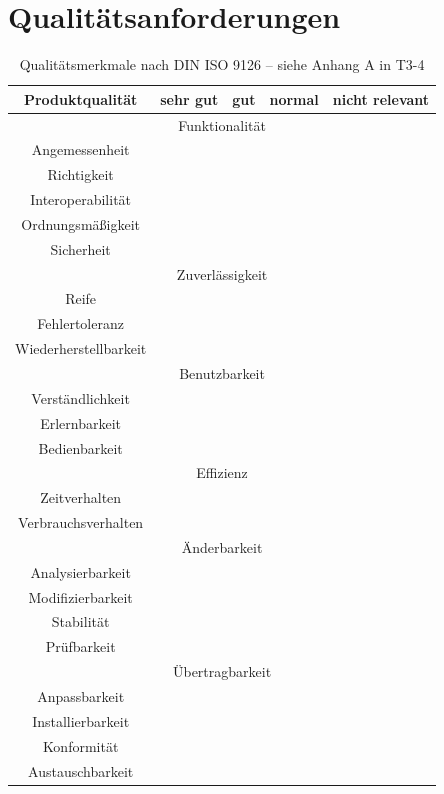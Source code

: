 	
	\section{Qualitätsanforderungen}
	\begin{table}[ht]
	\caption{Qualitätsmerkmale nach DIN ISO 9126 – siehe Anhang A in T3-4}
	\centering
		\begin{tabular}{|c|c|c|c|c|}
		\hline Produktqualität & sehr gut & gut & normal & nicht relevant \\ 
		\hline \multicolumn{5}{|c|}{Funktionalität}   \\ 
		\hline Angemessenheit &  &  & \checkmark &  \\ 
		\hline Richtigkeit &  & \checkmark  &  &  \\ 
		\hline Interoperabilität &  &\checkmark   &  &  \\ 
		\hline Ordnungsmäßigkeit &  &\checkmark   &  &  \\ 
		\hline Sicherheit &  &  & \checkmark  &  \\ 
		\hline \multicolumn{5}{|c|}{Zuverlässigkeit}   \\ 
		\hline Reife &  &   & \checkmark &  \\ 
		\hline Fehlertoleranz &  \checkmark &  &  &  \\ 
		\hline Wiederherstellbarkeit & \checkmark  &  &  &  \\ 
		\hline \multicolumn{5}{|c|}{Benutzbarkeit}  \\ 
		\hline Verständlichkeit &  &  & \checkmark  &  \\ 
		\hline Erlernbarkeit &  &   &  &\checkmark  \\ 
		\hline Bedienbarkeit &  &   & \checkmark &  \\ 
		\hline \multicolumn{5}{|c|}{Effizienz} \\ 
		\hline Zeitverhalten &  &  &\checkmark   &  \\ 
		\hline Verbrauchsverhalten &  &  &\checkmark   &  \\ 
		\hline \multicolumn{5}{|c|}{Änderbarkeit} \\ 
		\hline Analysierbarkeit &  &   & \checkmark &  \\ 
		\hline Modifizierbarkeit &  & \checkmark  &  &  \\ 
		\hline Stabilität & \checkmark  &  &  &  \\ 
		\hline Prüfbarkeit &   &  &\checkmark  &  \\ 
		\hline \multicolumn{5}{|c|}{Übertragbarkeit}  \\ 
		\hline Anpassbarkeit & \checkmark  &  &  &  \\ 
		\hline Installierbarkeit &  &  &  \checkmark &  \\ 
		\hline Konformität	 &  &  &\checkmark   &  \\ 
		\hline Austauschbarkeit &  &  &   & \checkmark \\ 
		\hline 
		\end{tabular} 
	\label{tab:quali_anf}
	\end{table}

